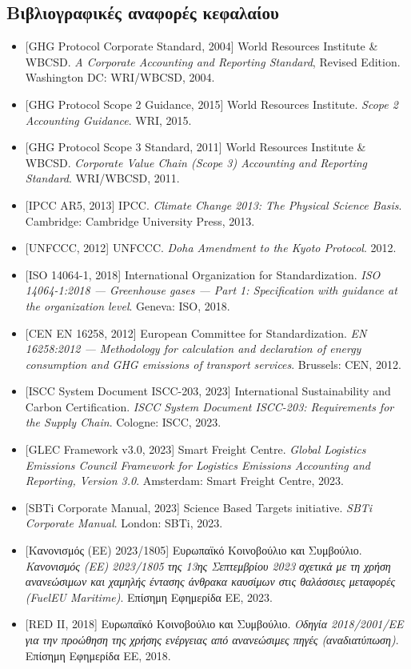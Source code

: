 \subsection{Βιβλιογραφικές αναφορές
κεφαλαίου}\label{ux3b2ux3b9ux3b2ux3bbux3b9ux3bfux3b3ux3c1ux3b1ux3c6ux3b9ux3baux3adux3c2-ux3b1ux3bdux3b1ux3c6ux3bfux3c1ux3adux3c2-ux3baux3b5ux3c6ux3b1ux3bbux3b1ux3afux3bfux3c5}

\begin{itemize}
\tightlist
\item
  {[}GHG Protocol Corporate Standard, 2004{]} World Resources Institute
  \& WBCSD. \emph{A Corporate Accounting and Reporting Standard},
  Revised Edition. Washington DC: WRI/WBCSD, 2004.
\item
  {[}GHG Protocol Scope 2 Guidance, 2015{]} World Resources Institute.
  \emph{Scope 2 Accounting Guidance}. WRI, 2015.
\item
  {[}GHG Protocol Scope 3 Standard, 2011{]} World Resources Institute \&
  WBCSD. \emph{Corporate Value Chain (Scope 3) Accounting and Reporting
  Standard}. WRI/WBCSD, 2011.
\item
  {[}IPCC AR5, 2013{]} IPCC. \emph{Climate Change 2013: The Physical
  Science Basis}. Cambridge: Cambridge University Press, 2013.
\item
  {[}UNFCCC, 2012{]} UNFCCC. \emph{Doha Amendment to the Kyoto
  Protocol}. 2012.
\item
  {[}ISO 14064-1, 2018{]} International Organization for
  Standardization. \emph{ISO 14064-1:2018 --- Greenhouse gases --- Part
  1: Specification with guidance at the organization level}. Geneva:
  ISO, 2018.
\item
  {[}CEN EN 16258, 2012{]} European Committee for Standardization.
  \emph{EN 16258:2012 --- Methodology for calculation and declaration of
  energy consumption and GHG emissions of transport services}. Brussels:
  CEN, 2012.
\item
  {[}ISCC System Document ISCC-203, 2023{]} International Sustainability
  and Carbon Certification. \emph{ISCC System Document ISCC-203:
  Requirements for the Supply Chain}. Cologne: ISCC, 2023.
\item
  {[}GLEC Framework v3.0, 2023{]} Smart Freight Centre. \emph{Global
  Logistics Emissions Council Framework for Logistics Emissions
  Accounting and Reporting, Version 3.0}. Amsterdam: Smart Freight
  Centre, 2023.
\item
  {[}SBTi Corporate Manual, 2023{]} Science Based Targets initiative.
  \emph{SBTi Corporate Manual}. London: SBTi, 2023.
\item
  {[}Κανονισμός (ΕΕ) 2023/1805{]} Ευρωπαϊκό Κοινοβούλιο και Συμβούλιο.
  \emph{Κανονισμός (ΕΕ) 2023/1805 της 13ης Σεπτεμβρίου 2023 σχετικά με
  τη χρήση ανανεώσιμων και χαμηλής έντασης άνθρακα καυσίμων στις
  θαλάσσιες μεταφορές (FuelEU Maritime)}. Επίσημη Εφημερίδα ΕΕ, 2023.
\item
  {[}RED II, 2018{]} Ευρωπαϊκό Κοινοβούλιο και Συμβούλιο. \emph{Οδηγία
  2018/2001/ΕΕ για την προώθηση της χρήσης ενέργειας από ανανεώσιμες
  πηγές (αναδιατύπωση)}. Επίσημη Εφημερίδα ΕΕ, 2018.
\end{itemize}


